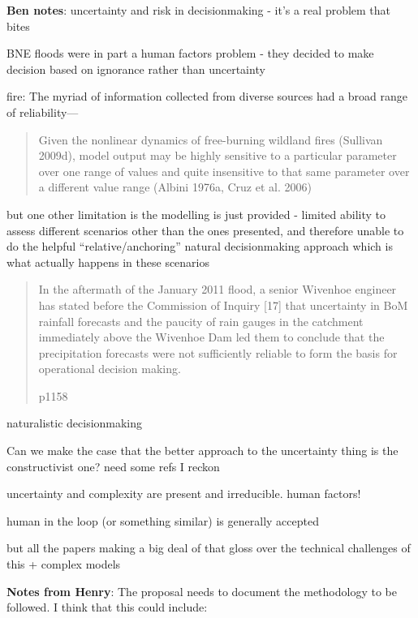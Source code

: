 \documentclass[a4paper,fontsize=12pt]{scrartcl}
\begin{document}

\textbf{Ben notes}: uncertainty and risk in decisionmaking - it's a
real problem that bites

BNE floods were in part a human factors problem - they decided to make
decision based on ignorance rather than uncertainty

fire: The myriad of information collected from diverse sources had a broad
range of reliability---\parencite{cruz_anatomy_2012}

\blockquote[\parencite{alexander_limitations_2013}]{Given the nonlinear
  dynamics of free-burning wildland fires (Sullivan 2009d), model
  output may be highly sensitive to a particular parameter over one
  range of values and quite insensitive to that same parameter over a
  different value range (Albini 1976a, Cruz et al. 2006)}

but one other limitation is the modelling is just provided - limited
ability to assess different scenarios other than the ones presented,
and therefore unable to do the helpful ``relative/anchoring'' natural
decisionmaking approach which is what actually happens in these
scenarios

\blockquote[\parencite{vandenhonert_2011_2011} p1158]{In the aftermath of
  the January 2011 flood, a senior Wivenhoe engineer has stated before
  the Commission of Inquiry [17] that uncertainty in BoM rainfall
  forecasts and the paucity of rain gauges in the catchment
  immediately above the Wivenhoe Dam led them to conclude that the
  precipitation forecasts were not sufficiently reliable to form the
  basis for operational decision making.}

naturalistic decisionmaking\parencite{lipshitz_taking_2001}

Can we make the case that the better approach to the uncertainty thing
is the constructivist one? need some refs I reckon


uncertainty and complexity are present and irreducible. human factors!

human in the loop (or something similar) is generally accepted

but all the papers making a big deal of that gloss over the technical
challenges of this + complex models

\textbf{Notes from Henry}:
The proposal needs to document the methodology to be followed. I think
that this could include:
\end{document}
